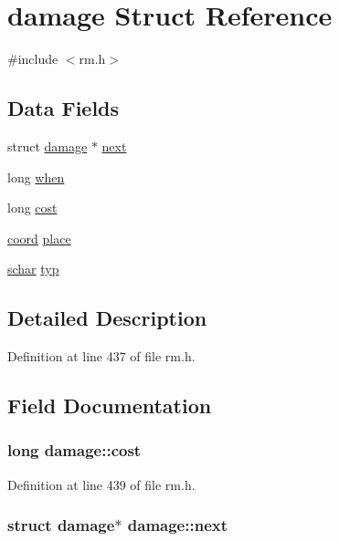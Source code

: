 \hypertarget{structdamage}{\section{damage Struct Reference}
\label{structdamage}
}


{\ttfamily \#include $<$rm.\+h$>$}

\subsection*{Data Fields}
\begin{DoxyCompactItemize}
\item 
struct \hyperlink{structdamage}{damage} $\ast$ \hyperlink{structdamage_accbaacc957cc3a4b110dc07fdb812ee6}{next}
\item 
long \hyperlink{structdamage_a6687c66d7fb711b93c07041046dd5617}{when}
\item 
long \hyperlink{structdamage_a8f4d31ec5d2b12864546ca0d50545e04}{cost}
\item 
\hyperlink{structcoord}{coord} \hyperlink{structdamage_ae081f30fd293bc250a908e8d4e0971b7}{place}
\item 
\hyperlink{config_8h_a0fd9ce9d735064461bebfe6037026093}{schar} \hyperlink{structdamage_ac2d6d4c8df1fc9712a47662aa7506b9b}{typ}
\end{DoxyCompactItemize}


\subsection{Detailed Description}


Definition at line 437 of file rm.\+h.



\subsection{Field Documentation}
\hypertarget{structdamage_a8f4d31ec5d2b12864546ca0d50545e04}{
\subsubsection[{cost}]{\setlength{\rightskip}{0pt plus 5cm}long damage\+::cost}}\label{structdamage_a8f4d31ec5d2b12864546ca0d50545e04}


Definition at line 439 of file rm.\+h.

\hypertarget{structdamage_accbaacc957cc3a4b110dc07fdb812ee6}{
\subsubsection[{next}]{\setlength{\rightskip}{0pt plus 5cm}struct {\bf damage}$\ast$ damage\+::next}}\label{structdamage_accbaacc957cc3a4b110dc07fdb812ee6}


